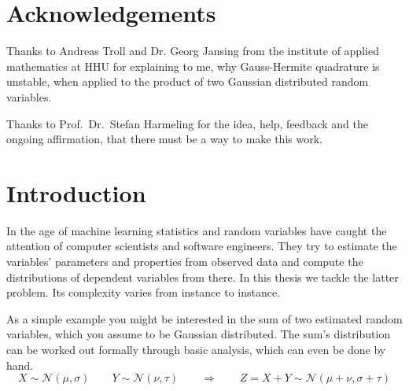 \documentclass[11pt,a4paper]{book}
\begin{document}
\cleardoublepage

\chapter*{Acknowledgements}

Thanks to Andreas Troll and Dr. Georg Jansing from the institute of applied
mathematics at HHU for explaining to me, why Gauss-Hermite quadrature is
unstable, when applied to the product of two Gaussian distributed random
variables.

Thanks to Prof.~Dr.~Stefan Harmeling for the idea, help, feedback and the
ongoing affirmation, that there must be a way to make this work.

\tableofcontents

\cleardoublepage

\mainmatter
\pagestyle{fancy}

\chapter{Introduction}

In the age of machine learning statistics and random variables have caught the
attention of computer scientists and software engineers. They try to estimate
the variables' parameters and properties from observed data and compute the
distributions of dependent variables from there. In this thesis we tackle the
latter problem. Its complexity varies from instance to instance.

As a simple example you might be interested in the sum of two estimated random
variables, which you assume to be Gaussian distributed. The sum's distribution
can be worked out formally through basic analysis, which can even be done by
hand.
\begin{equation*}
  X \sim \mathcal{N}(\mu, \sigma) \qquad Y \sim \mathcal{N}(\nu, \tau) \qquad \Rightarrow \qquad Z = X + Y \sim \mathcal{N}(\mu + \nu, \sigma + \tau)
\end{equation*}
\end{document}
